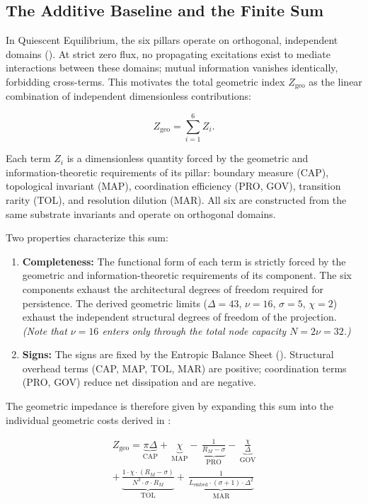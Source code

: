 \subsection{The Additive Baseline and the Finite Sum}
\label{sec:additive_baseline}

In Quiescent Equilibrium, the six pillars operate on orthogonal, independent domains (). At strict zero flux, no propagating excitations exist to mediate interactions between these domains; mutual information vanishes identically, forbidding cross-terms. This motivates the total geometric index $Z_{\text{geo}}$ as the linear combination of independent dimensionless contributions:

\begin{equation}
    Z_{\text{geo}} = \sum_{i=1}^6 Z_i.
\end{equation}

Each term $Z_i$ is a dimensionless quantity forced by the geometric and information-theoretic requirements of its pillar: boundary measure (CAP), topological invariant (MAP), coordination efficiency (PRO, GOV), transition rarity (TOL), and resolution dilution (MAR). All six are constructed from the same substrate invariants and operate on orthogonal domains. 

Two properties characterize this sum:
\begin{enumerate}
    \item \textbf{Completeness:} The functional form of each term is strictly forced by the geometric and information-theoretic requirements of its component. The six components exhaust the architectural degrees of freedom required for persistence. The derived geometric limits ($\Delta = 43$, $\nu = 16$, $\sigma = 5$, $\chi = 2$) exhaust the independent structural degrees of freedom of the projection. \textit{(Note that $\nu=16$ enters only through the total node capacity $N=2\nu=32$.)}
    
    \item \textbf{Signs:} The signs are fixed by the Entropic Balance Sheet (). Structural overhead terms (CAP, MAP, TOL, MAR) are positive; coordination terms (PRO, GOV) reduce net dissipation and are negative.
\end{enumerate}

The geometric impedance is therefore given by expanding this sum into the individual geometric costs derived in :

\begin{equation}\label{eq:alpha_inverse}
\begin{split}
Z_{\text{geo}} = \underbrace{\pi\Delta}_{\text{CAP}}
+ \,\underbrace{\chi}_{\text{MAP}}
- \,\underbrace{\frac{1}{R_M - \sigma}}_{\text{PRO}}
- \,\underbrace{\frac{\chi}{\Delta}}_{\text{GOV}} \\
+ \,\underbrace{\frac{1 \cdot \chi \cdot (R_M - \sigma)}{N^3 \cdot \sigma \cdot R_M}}_{\text{TOL}}
+ \,\underbrace{\frac{1}{L_{\text{embed}} \cdot (\sigma + 1) \cdot \Delta^2}}_{\text{MAR}}
\end{split}
\end{equation}



